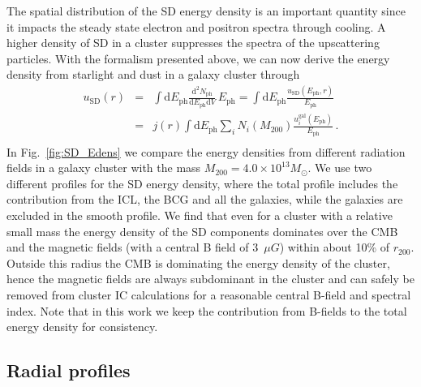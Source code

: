\documentclass[10pt,aps,pra,reprint,amsmath,amsfonts,amssymb,showpacs]{revtex4-1}
\newcommand{\rmn}{\mathrm}
\newcommand{\ph}{\rmn{ph}}
\newcommand{\eph}{E_\ph}
\newcommand{\gal}{\rmn{gal}}
\newcommand{\sd}{\rmn{SD}}
\newcommand{\msun}{M_\odot}
\newcommand{\dd}{\rmn{d}}
\newcommand{\rvir}{r_{200}}
\newcommand{\mvir}{M_{200}}
\begin{document}
The spatial distribution of the SD energy density is an important quantity since
it impacts the steady state electron and positron spectra through cooling. A
higher density of SD in a cluster suppresses the spectra of the upscattering
particles. With the formalism presented above, we can now derive the energy
density from starlight and dust in a galaxy cluster through
\begin{eqnarray}
\label{eq:U_SD}
u_\sd(r) &=& \int \dd \eph \frac{\dd^2 N_\ph}{\dd \eph \dd V}\,\eph
=\int \dd \eph \frac{u_\sd(\eph, r)}{\eph}
\nonumber \\
&=&  j(r)  \int \dd \eph \sum_i 
N_i(\mvir) \frac{u_i^\gal(\eph)}{\eph}\,. \nonumber \\
\end{eqnarray}
In Fig.~\ref{fig:SD_Edens} we compare the energy densities from
different radiation fields in a galaxy cluster with the mass
$\mvir=4.0\times10^{13}\msun$. We use two different profiles for the
SD energy density, where the total profile includes the contribution
from the ICL, the BCG and all the galaxies, while the galaxies are
excluded in the smooth profile. We find that even for a cluster with a
relative small mass the energy density of the SD components dominates
over the CMB and the magnetic fields (with a central B field of 3~$\mu
G$) within about 10\% of $\rvir$. Outside this radius the CMB is
dominating the energy density of the cluster, hence the magnetic
fields are always subdominant in the cluster and can safely be removed
from cluster IC calculations for a reasonable central B-field and
spectral index. Note that in this work we keep the contribution
from B-fields to the total energy density for consistency.


\subsection{Radial profiles}
\end{document}
